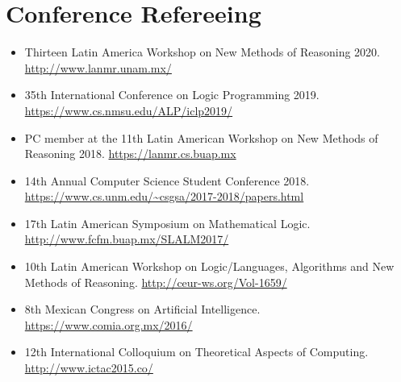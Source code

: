 \section{Conference Refereeing}

\begin{itemize}

  \item Thirteen Latin America 
    Workshop on New Methods of Reasoning 2020. 
    \url{http://www.lanmr.unam.mx/}

  \item 35th International Conference on Logic Programming
    2019. \url{https://www.cs.nmsu.edu/ALP/iclp2019/}

  \item PC member at the 11th Latin American Workshop on New Methods of
    Reasoning 2018. \url{https://lanmr.cs.buap.mx}

  \item 14th Annual Computer Science Student Conference
    2018. \url{https://www.cs.unm.edu/~csgsa/2017-2018/papers.html}

  \item 17th Latin American Symposium on Mathematical
    Logic. \url{http://www.fcfm.buap.mx/SLALM2017/}

  \item 10th Latin American Workshop on Logic/Languages,
    Algorithms and New Methods of Reasoning. \url{http://ceur-ws.org/Vol-1659/}

  \item 8th Mexican Congress on Artificial Intelligence.
    \url{https://www.comia.org.mx/2016/}

  \item 12th International Colloquium on Theoretical
    Aspects of Computing. \url{http://www.ictac2015.co/}

\end{itemize}

